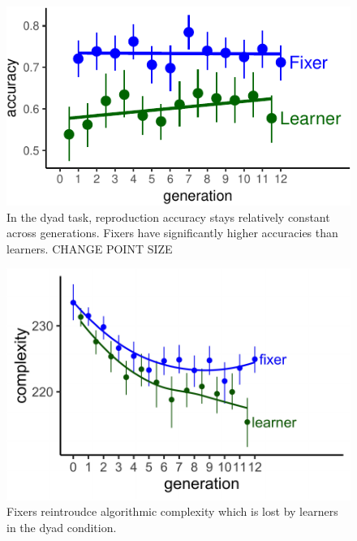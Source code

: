 \documentclass[10pt, letterpaper]{article}
\newenvironment{CodeChunk}{}{}
\begin{document}
\begin{CodeChunk}
\begin{figure}[tb]

{\centering \includegraphics{figs/dyad_accuracy-1} 

}

\caption[In the dyad task, reproduction accuracy stays relatively constant across generations]{In the dyad task, reproduction accuracy stays relatively constant across generations. Fixers have significantly higher accuracies than learners. CHANGE POINT SIZE}\label{fig:dyad_accuracy}
\end{figure}
\end{CodeChunk}

\begin{CodeChunk}
\begin{figure}[tb]

{\centering \includegraphics{figs/dyad_complexity-1} 

}

\caption[Fixers reintroudce algorithmic complexity which is lost by learners in the dyad condition]{Fixers reintroudce algorithmic complexity which is lost by learners in the dyad condition.}\label{fig:dyad_complexity}
\end{figure}
\end{CodeChunk}
\end{document}
